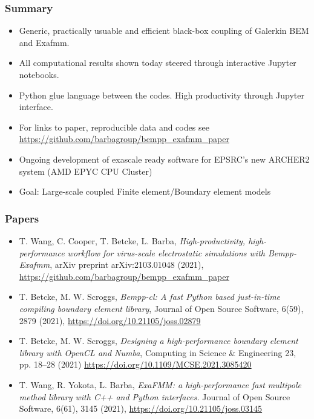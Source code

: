 \documentclass[dvipsnames,10pt]{beamer}
\begin{document}
\begin{frame}
    \frametitle{Summary}

    \begin{itemize}
        \item Generic, practically usuable and efficient black-box coupling of Galerkin
            BEM and Exafmm.
        \item All computational results shown today steered through interactive Jupyter
            notebooks.
        \item Python glue language between the codes. High productivity through Jupyter
            interface.
        \item For links to paper, reproducible data and codes see\\
            \url{https://github.com/barbagroup/bempp_exafmm_paper}
        \item Ongoing development of exascale ready software for EPSRC's new ARCHER2 system (AMD EPYC CPU Cluster)
        \item Goal: Large-scale coupled Finite element/Boundary element models
    \end{itemize}


\end{frame}

\begin{frame}
    \frametitle{Papers}

{
    \small

\begin{itemize}
    \item T. Wang, C. Cooper, T. Betcke, L. Barba, \textit{High-productivity, 
        high-performance workflow for virus-scale electrostatic simulations with 
    Bempp-Exafmm}, arXiv preprint arXiv:2103.01048 (2021), 
    \url{https://github.com/barbagroup/bempp_exafmm_paper}
    \item T. Betcke, M. W. Scroggs, \textit{Bempp-cl: A fast Python based 
        just-in-time compiling boundary element library}, 
        Journal of Open Source Software, 6(59), 2879 (2021), 
            \url{https://doi.org/10.21105/joss.02879}
    \item T. Betcke, M. W. Scroggs, \textit{Designing a high-performance boundary 
        element library with OpenCL and Numba}, 
        Computing in Science \& Engineering 23, pp. 18--28 (2021) 
        \url{https://doi.org/10.1109/MCSE.2021.3085420} 
    \item T. Wang, R. Yokota, L. Barba, \textit{ExaFMM: a high-performance 
            fast multipole method library with C++ and Python interfaces.}
        Journal of Open Source Software, 6(61), 3145 (2021),
        \url{https://doi.org/10.21105/joss.03145}
    \end{itemize}

}


    \vspace{1cm}


\end{frame}
\end{document}
